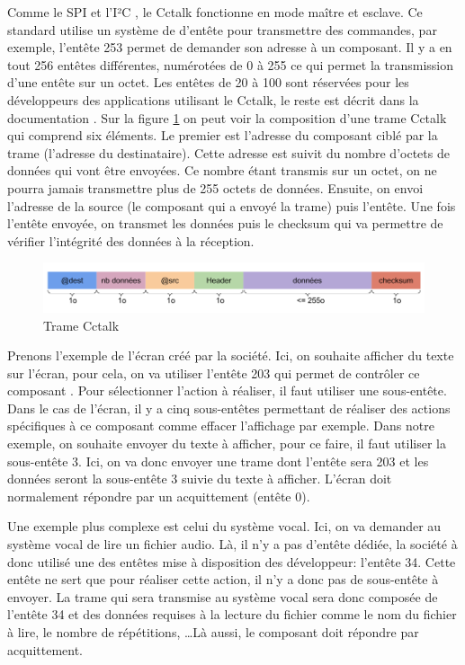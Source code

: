 \documentclass[a4paper]{article}
\begin{document}
Comme le SPI et l'I²C , le Cctalk fonctionne en mode maître et esclave. Ce
standard utilise un système de d'entête pour transmettre des commandes, par
exemple, l'entête 253 permet de demander son adresse à un composant. Il y a en
tout 256 entêtes différentes, numérotées de 0 à 255 ce qui permet la
transmission d'une entête sur un octet. Les entêtes de 20 à 100 sont réservées
pour les développeurs des applications utilisant le Cctalk, le reste est décrit
dans la documentation \cite{cctalkpt2}. Sur la figure \ref{tramecctalk} on peut
voir la composition d'une trame Cctalk qui comprend six éléments. Le premier est
l'adresse du composant ciblé par la trame (l'adresse du destinataire). Cette
adresse est suivit du nombre d'octets de données qui vont être envoyées. Ce
nombre étant transmis sur un octet, on ne pourra jamais transmettre plus de 255
octets de données. Ensuite, on envoi l'adresse de la source (le composant qui a
envoyé la trame) puis l'entête. Une fois l'entête envoyée, on transmet les
données puis le checksum qui va permettre de vérifier l'intégrité des données à
la réception.

\begin{figure}[h!]
  \begin{center}
  \includegraphics[scale=0.4]{./img/trame-cctalk.png}
  \caption{Trame Cctalk}
    \label{tramecctalk}
  \end{center}
\end{figure}

Prenons l'exemple de l'écran créé par la société. Ici, on souhaite afficher du
texte sur l'écran, pour cela, on va utiliser l'entête 203 qui permet de
contrôler ce composant \cite{cctalkpt2}. Pour sélectionner l'action à réaliser,
il faut utiliser une sous-entête. Dans le cas de l'écran, il y a cinq
sous-entêtes permettant de réaliser des actions spécifiques à ce composant comme
effacer l'affichage par exemple. Dans notre exemple, on souhaite envoyer du
texte à afficher, pour ce faire, il faut utiliser la sous-entête 3. Ici, on va
donc envoyer une trame dont l'entête sera 203 et les données seront la
sous-entête 3 suivie du texte à afficher. L'écran doit normalement répondre par
un acquittement (entête 0).

Une exemple plus complexe est celui du système vocal. Ici, on va demander au
système vocal de lire un fichier audio. Là, il n'y a pas d'entête dédiée, la
société à donc utilisé une des entêtes mise à disposition des développeur:
l'entête 34. Cette entête ne sert que pour réaliser cette action, il n'y a donc
pas de sous-entête à envoyer. La trame qui sera transmise au système vocal sera
donc composée de l'entête 34 et des données requises à la lecture du fichier
comme le nom du fichier à lire, le nombre de répétitions, \dots Là aussi, le
composant doit répondre par acquittement.
\\~\\
\end{document}
